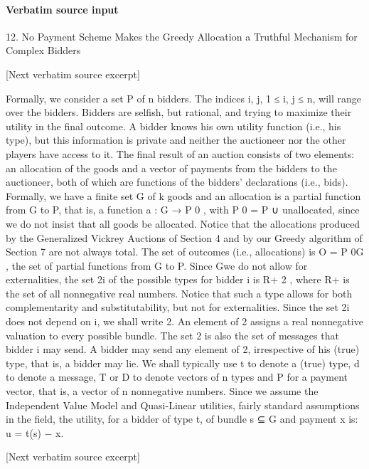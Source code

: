 \documentclass[10pt]{article}
\begin{document}
\paragraph{Verbatim source input}
\begin{ReviewVerbatim}
12. No Payment Scheme Makes the Greedy Allocation a Truthful
Mechanism for Complex Bidders

[Next verbatim source excerpt]

Formally, we consider a set P of n bidders. The indices i, j, 1 ≤ i, j ≤ n, will
range over the bidders. Bidders are selfish, but rational, and trying to maximize their
utility in the final outcome. A bidder knows his own utility function (i.e., his type),
but this information is private and neither the auctioneer nor the other players have
access to it. The final result of an auction consists of two elements: an allocation
of the goods and a vector of payments from the bidders to the auctioneer, both of
which are functions of the bidders’ declarations (i.e., bids). Formally, we have a
finite set G of k goods and an allocation is a partial function from G to P, that is, a
function a : G → P 0 , with P 0 = P ∪ {unallocated}, since we do not insist that all
goods be allocated. Notice that the allocations produced by the Generalized Vickrey
Auctions of Section 4 and by our Greedy algorithm of Section 7 are not always
total. The set of outcomes (i.e., allocations) is O = P 0G , the set of partial functions
from G to P. Since Gwe do not allow for externalities, the set 2i of the possible types
for bidder i is R+ 2 , where R+ is the set of all nonnegative real numbers. Notice
that such a type allows for both complementarity and substitutability, but not for
externalities. Since the set 2i does not depend on i, we shall write 2. An element
of 2 assigns a real nonnegative valuation to every possible bundle. The set 2 is
also the set of messages that bidder i may send. A bidder may send any element of
2, irrespective of his (true) type, that is, a bidder may lie. We shall typically use t
to denote a (true) type, d to denote a message, T or D to denote vectors of n types
and P for a payment vector, that is, a vector of n nonnegative numbers.
Since we assume the Independent Value Model and Quasi-Linear utilities, fairly
standard assumptions in the field, the utility, for a bidder of type t, of bundle s ⊆ G
and payment x is:
u = t(s) − x.

[Next verbatim source excerpt]


\end{ReviewVerbatim}
\end{document}
